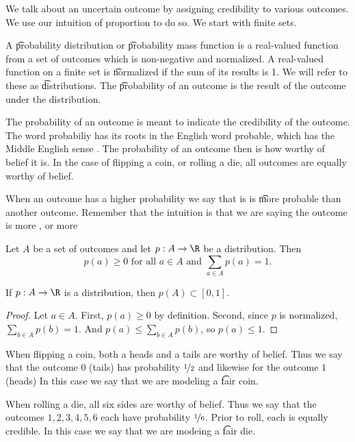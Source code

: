 

We talk about an uncertain outcome by assigning credibility to various outcomes.
We use our intuition of proportion to do so.
We start with finite sets.


A \t{probability distribution} or \t{probability mass function} is a real-valued function from a set of outcomes which is non-negative and normalized.
A real-valued function on a finite set is \t{normalized} if the sum of its results is 1.
We will refer to these as \t{distributions}.
The \t{probability of an outcome} is the result of the outcome under the distribution.

The probability of an outcome is meant to indicate the credibility of the outcome.
The word probabiliy has its roots in the English word probable, which has the Middle English sense .
The probability of an outcome then is how worthy of belief it is.
In the case of flipping a coin, or rolling a die, all outcomes are equally worthy of belief.

When an outcome has a higher probability we say that is is \t{more probable} than another outcome.
Remember that the intuition is that we are saying the outcome is more , or more 


Let $A$ be a set of outcomes and let $p: A \to \R$ be a distribution.
Then
\[
  p(a) \geq 0 \text{ for all } a \in A \text{ and } \sum_{a \in A} p(a) = 1.
\]

\begin{prop}
If $p: A \to \R$ is a distribution, then $p(A) \subset [0, 1]$.
\begin{proof}

Let $a \in A$.
First, $p(a) \geq 0$ by definition.
Second, since $p$ is normalized, $\sum_{b \in A} p(b) = 1$.
And $p(a) \leq \sum_{b \in A} p(b)$, so $p(a) \leq 1$.

\end{proof}

\end{prop}

When flipping a coin, both a heads and a tails are worthy of belief.
Thus we say that the outcome $0$ (tails) has probability $\nicefrac{1}{2}$ and likewise for the outcome $1$ (heads)
In this case we say that we are modeling a \t{fair coin}.

When rolling a die, all six sides are worthy of belief.
Thus we say that the outcomes $1, 2, 3, 4, 5, 6$ each have probability $\nicefrac{1}{6}$.
Prior to roll, each is equally credible.
In this case we say that we are modeing a \t{fair die}.
